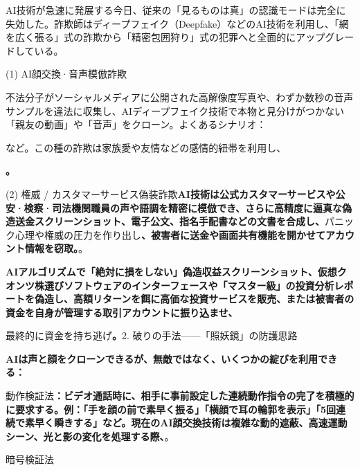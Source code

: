 AI技術が急速に発展する今日、従来の「見るものは真」の認識モードは完全に失効した。詐欺師はディープフェイク（Deepfake）などのAI技術を利用し、「網を広く張る」式の詐欺から「精密包囲狩り」式の犯罪へと全面的にアップグレードしている。


(1) AI顔交換·音声模倣詐欺

不法分子がソーシャルメディアに公開された高解像度写真や、わずか数秒の音声サンプルを違法に収集し、AIディープフェイク技術で本物と見分けがつかない「親友の動画」や「音声」をクローン。よくあるシナリオ：


など。この種の詐欺は家族愛や友情などの感情的紐帯を利用し、


\textbf{。}\par

(2) 権威 / カスタマーサービス偽装詐欺\textbf{AI技術は公式カスタマーサービスや公安·検察·司法機関職員の声や語調を精密に模倣でき、さらに高精度に逼真な偽造送金スクリーンショット、電子公文、指名手配書などの文書を合成し、}パニック心理や権威の圧力を作り出し\textbf{、被害者に送金や画面共有機能を開かせてアカウント情報を窃取。}。

\textbf{AIアルゴリズムで「絶対に損をしない」偽造収益スクリーンショット、仮想クオンツ株選びソフトウェアのインターフェースや「マスター級」の投資分析レポートを偽造し、高額リターンを餌に高価な投資サービスを販売、または被害者の資金を自身が管理する取引アカウントに振り込ませ、}\par

最終的に資金を持ち逃げ\textbf{。}2. 破りの手法——「照妖鏡」の防護思路

\textbf{AIは声と顔をクローンできるが、無敵ではなく、いくつかの綻びを利用できる：}\par

動作検証法\textbf{：ビデオ通話時に、相手に事前設定した連続動作指令の完了を積極的に要求する。例：「手を顔の前で素早く振る」「横顔で耳の輪郭を表示」「5回連続で素早く瞬きする」など。現在のAI顔交換技術は複雑な動的遮蔽、高速運動シーン、光と影の変化を処理する際、}。


暗号検証法

